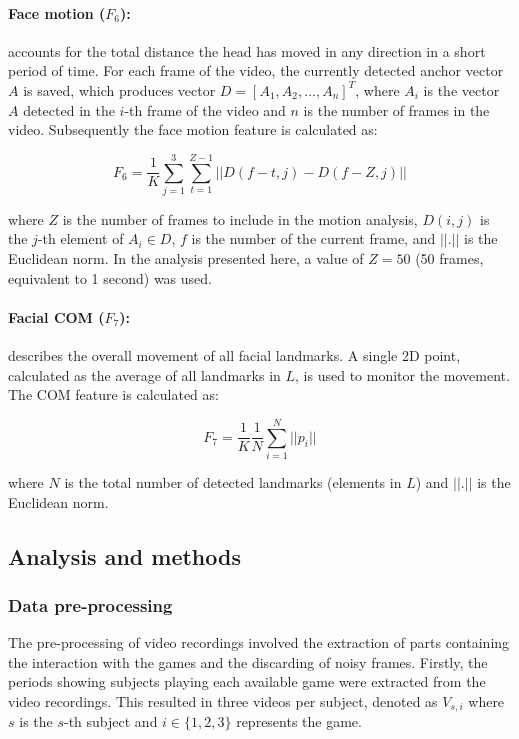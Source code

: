 \paragraph{Face motion ($F_6$):} accounts for the total distance the head has moved in any direction in a short period of time. For each frame of the video, the currently detected anchor vector $A$ is saved, which produces vector $D = [A_1, A_2, \dots, A_n]^T$, where $A_i$ is the vector $A$ detected in the $i$-th frame of the video and $n$ is the number of frames in the video. Subsequently the face motion feature is calculated as:

\[
F_6 = \frac{1}{K} \sum_{j=1}^{3} \sum_{t=1}^{Z - 1} || D(f - t, j) - D(f - Z, j) ||
\]

where $Z$ is the number of frames to include in the motion analysis, $D(i,j)$ is the $j$-th element of $A_i \in D$, $f$ is the number of the current frame, and $||.||$ is the Euclidean norm. In the analysis presented here, a value of $Z=50$ (50 frames, equivalent to 1 second) was used.

\paragraph{Facial COM ($F_7$):} describes the overall movement of all facial landmarks. A single 2D point, calculated as the average of all landmarks in $L$, is used to monitor the movement. The COM feature is calculated as:

\[
F_7 = \frac{1}{K} \frac{1}{N} \sum_{i=1}^{N} || p_i ||
\]

where $N$ is the total number of detected landmarks (elements in $L$) and $||.||$ is the Euclidean norm.

\subsection{Analysis and methods}
\label{sec:experiment1-study4-feature-analysis}

\subsubsection{Data pre-processing}

The pre-processing of video recordings involved the extraction of parts containing the interaction with the games and the discarding of noisy frames. Firstly, the periods showing subjects playing each available game were extracted from the video recordings. This resulted in three videos per subject, denoted as $V_{s,i}$ where $s$ is the $s$-th subject and $i \in \{1, 2, 3\}$ represents the game.


